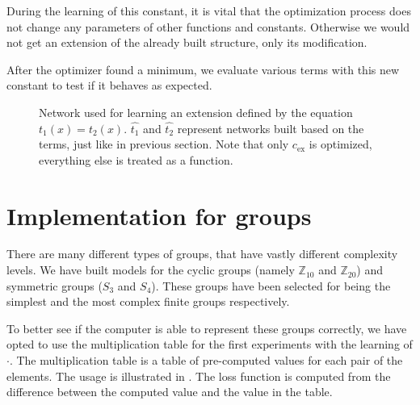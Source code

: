 During the learning of this constant, it is vital that the optimization process does not change any parameters of other functions and constants. Otherwise we would not get an  extension of the already built structure, only its modification.

After the optimizer found a minimum, we evaluate various terms with this new constant to test if it behaves as expected.

\begin{figure}
\caption{Network used for learning an extension defined by the equation $t_1(x)=t_2(x)$. $\widehat{t_1}$ and $\widehat{t_2}$ represent networks built based on the terms, just like in previous section. Note that only $c_{\text{ex}}$ is optimized, everything else is treated as a function.}
\centering
\label{learning_extension}
\end{figure}

\section{Implementation for groups}
\label{section:group_impl}
There are many different types of groups, that have vastly different complexity levels. We have built models for the cyclic groups (namely $\mathbb{Z}_{10}$ and $\mathbb{Z}_{20}$) and symmetric groups ($S_3$ and $S_4$). These groups have been selected for being the simplest and the most complex finite groups respectively.

To better see if the computer is able to represent these groups correctly, we have opted to use the multiplication table for the first experiments with the learning of $\cdot$. The multiplication table is a table of pre-computed values for each pair of the elements. The usage is illustrated in . The loss function is computed from the difference between the computed value and the value in the table.


